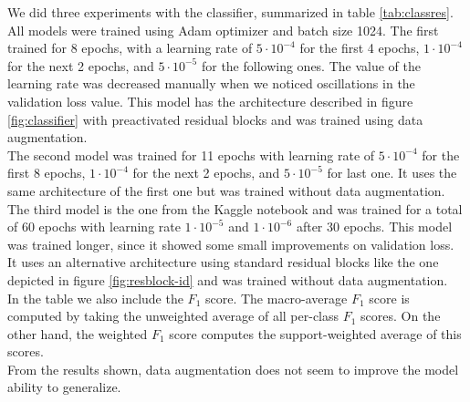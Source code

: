 We did three experiments with the classifier, summarized in table \ref{tab:classres}. All models were trained using Adam optimizer and batch size 1024. The first trained for 8 epochs, with a learning rate of $5 \cdot 10^{-4}$ for the first 4 epochs, $1 \cdot 10^{-4}$ for the next 2 epochs, and $5 \cdot 10^{-5}$ for the following ones. The value of the learning rate was decreased manually when we noticed oscillations in the validation loss value. This model has the architecture described in figure \ref{fig:classifier} with preactivated residual blocks and was trained using data augmentation. \\
The second model was trained for 11 epochs with learning rate of $5 \cdot 10^{-4}$ for the first 8 epochs, $1 \cdot 10^{-4}$ for the next 2 epochs, and $5 \cdot 10^{-5}$ for last one. It uses the same architecture of the first one but was trained without data augmentation.
The third model is the one from the Kaggle notebook and was trained for a total of 60 epochs with learning rate $1 \cdot 10^{-5}$ and $1 \cdot 10^{-6}$ after 30 epochs. This model was trained longer, since it showed some small improvements on validation loss. It uses an alternative architecture using standard residual blocks like the one depicted in figure \ref{fig:resblock-id} and was trained without data augmentation.\\
In the table we also include the $F_1$ score. The macro-average $F_1$ score is computed by taking the unweighted average of all per-class $F_1$ scores. On the other hand, the weighted $F_1$ score computes the support-weighted average of this scores.\\
From the results shown, data augmentation does not seem to improve the model ability to generalize.